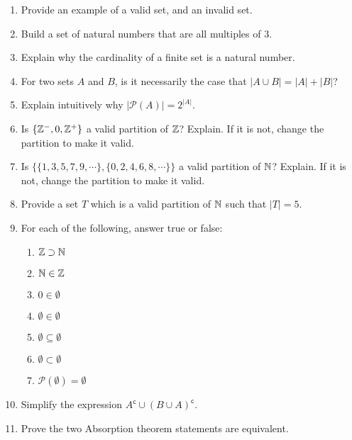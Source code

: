 \documentclass[main.tex]{subfiles}
\begin{document}
\begin{enumerate}
	\item Provide an example of a valid set, and an invalid set.
	\item Build a set of natural numbers that are all multiples of 3.
	\item Explain why the cardinality of a finite set is a natural number.
	\item For two sets \(A\) and \(B\), is it necessarily the case that \(|A \cup B| = |A| + |B|\)?
	\item Explain intuitively why \(|\mathcal{P}(A)| = 2^{|A|}\).
	\item Is \(\{\mathbb{Z}^-, 0, \mathbb{Z}^+\}\) a valid partition of \(\mathbb{Z}\)? Explain. If it is not, change the partition to make it valid.
	\item Is \(\{\{1,3,5,7,9,\cdots\} , \{0,2,4,6,8,\cdots\}\}\) a valid partition of \(\mathbb{N}\)? Explain. If it is not, change the partition to make it valid.
	\item Provide a set \(T\) which is a valid partition of \(\mathbb{N}\) such that \(|T| = 5\).
	\item For each of the following, answer true or false:
	\begin{enumerate}
		\item \(\mathbb{Z} \supset \mathbb{N}\)
		\item \(\mathbb{N} \in \mathbb{Z}\)
		\item \(0 \in \emptyset\)
		\item \(\emptyset \in \emptyset\)
		\item \(\emptyset \subseteq \emptyset\)
		\item \(\emptyset \subset \emptyset\)
		\item \(\mathcal{P}(\emptyset) = \emptyset\)
	\end{enumerate}
	\item Simplify the expression \(A^{\mathsf{c}} \cup (B \cup A)^{\mathsf{c}}\).
	\item Prove the two Absorption theorem statements are equivalent.
\end{enumerate}
\end{document}
